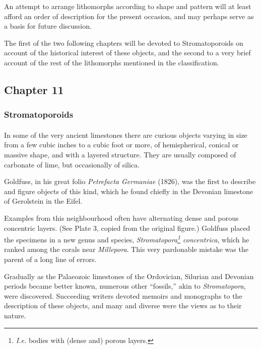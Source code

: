 \documentclass[a4paper, 12pt, oneside]{article}
\begin{document}
An attempt to arrange lithomorphs according to shape and pattern will at least afford an order of description for the present occasion, and may perhaps serve as a basis for future discussion.

The first of the two following chapters will be devoted to Stromatoporoids on account of the historical interest of these objects, and the second to a very brief account of the rest of the lithomorphs mentioned in the classification.
\clearpage
\subsection{Chapter 11}
\subsubsection{Stromatoporoids}
\paragraph{}
In some of the very ancient limestones there are curious objects varying in size from a few cubic inches to a cubic foot or more, of hemispherical, conical or massive shape, and with a layered structure. They are usually composed of carbonate of lime, but occasionally of silica.

Goldfuss, in his great folio \emph{Petrefacta Germaniae} (1826), was the first to describe and figure objects of this kind, which he found chiefly in the Devonian limestone of Gerolstein in the Eifel.

Examples from this neighbourhood often have alternating dense and porous concentric layers. (See Plate 3, copied from the original figure.) Goldfuss placed the specimens in a new genus and species, \emph{Stromatopora\footnote{\emph{I.e.} bodies with (dense and) porous layers.} concentrica}, which he ranked among the corals near \emph{Millepora}. This very pardonable mistake was the parent of a long line of errors.

Gradually as the Palaeozoic limestones of the Ordovician, Silurian and Devonian periods became better known, numerous other ``fossils,'' akin to \emph{Stromatopora}, were discovered. Succeeding writers devoted memoirs and monographs to the description of these objects, and many and diverse were the views as to their nature.
\end{document}
